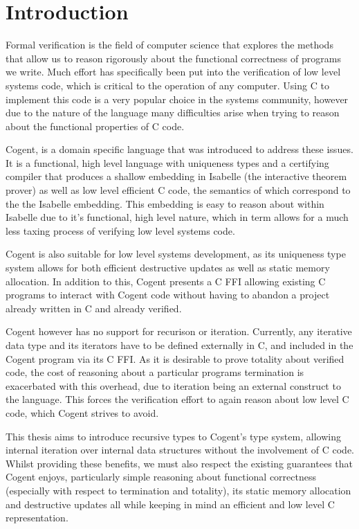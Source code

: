 \chapter{Introduction}\label{ch:intro}


Formal verification is the field of computer science that explores the methods that allow us to
  reason rigorously about the functional correctness of programs we write. 
Much effort has specifically been put into the verification of low level systems code,
  which is critical to the operation of any computer.
Using C to implement this code is a very popular choice in the systems community,
  however due to the nature of the language many difficulties arise when trying to
  reason about the functional properties of C code.

Cogent\cite{OCo16}, is a domain specific language that was introduced to address these issues.
It is a functional, high level language with uniqueness types and a certifying compiler
  that produces a shallow embedding in Isabelle (the interactive theorem prover) as well as low level efficient C code,
  the semantics of which correspond to the the Isabelle embedding.
This embedding is easy to reason about within Isabelle due to it's functional,
  high level nature, which in term allows for a much less taxing process of verifying low level systems code. 

Cogent is also suitable for low level systems development,
  as its uniqueness type system allows for both efficient destructive updates as well as static memory allocation.
In addition to this, Cogent presents a C FFI allowing existing C programs to interact with Cogent code without having to
  abandon a project already written in C and already verified.

Cogent however has no support for recurison or iteration. 
Currently, any iterative data type and its iterators have to be defined externally in C,
  and included in the Cogent program via its C FFI.
As it is desirable to prove totality about verified code,
  the cost of reasoning about a particular programs termination is exacerbated with this overhead,
  due to iteration being an external construct to the language.
This forces the verification effort to again reason about low level C code, which Cogent strives to avoid.

This thesis aims to introduce recursive types to Cogent's type system, allowing internal iteration over
  internal data structures without the involvement of C code.
Whilst providing these benefits, we must also respect the existing guarantees that Cogent enjoys,
  particularly simple reasoning about functional correctness (especially with respect to termination and totality),
  its static memory allocation and destructive updates all while keeping in mind
  an efficient and low level C representation.
